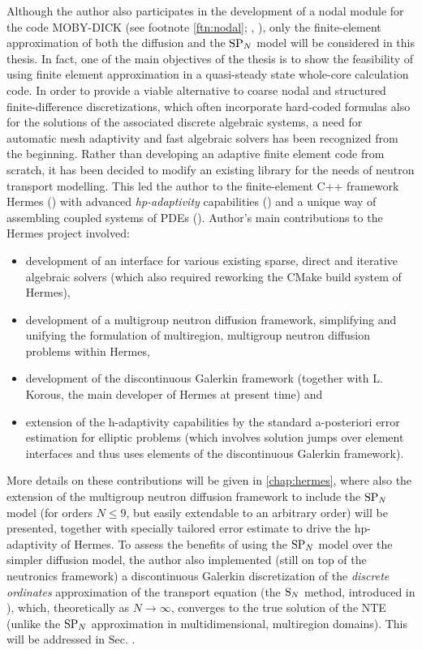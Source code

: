 Although the author also participates in the development of a nodal module for the code MOBY-DICK (see footnote
\ref{ftn:nodal}; \cite{Hanus2}, \cite[Chap. 4]{Hanus3}), only the finite-element approximation of both the diffusion and
the $\text{SP}_{N}$ model will be considered in this thesis. In fact, one of the main objectives of the thesis is to show the
feasibility of using finite element approximation in a quasi-steady state whole-core calculation code. In order to
provide a viable alternative to coarse nodal and structured finite-difference discretizations, which often incorporate
hard-coded formulas also for the solutions of the associated discrete algebraic systems, a need for automatic mesh
adaptivity and fast algebraic solvers has been recognized from the beginning. Rather than developing an adaptive finite
element code from scratch, it has been decided to modify an existing library for the needs of neutron transport
modelling. This led the author to the finite-element C++ framework Hermes (\cite{Hermes-project}) with advanced
\textit{hp-adaptivity} capabilities (\cite{Hermes-hanging-nodes}) and a unique way of assembling coupled systems of PDEs (\cite{Hermes-thermoelasticity}).
Author's main contributions to the Hermes project involved:
\begin{itemize}
    \item development of an interface for various existing sparse,
direct and iterative algebraic solvers (which also required reworking the CMake build system of Hermes),
	\item development of a multigroup neutron diffusion framework, simplifying and unifying the formulation of
	multiregion, multigroup neutron diffusion problems within Hermes,
	\item development of the discontinuous Galerkin framework (together with L. Korous, the main developer of Hermes at
	present time) and
	\item extension of the h-adaptivity capabilities by the standard a-posteriori error estimation for elliptic problems (which
involves solution jumps over element interfaces and thus uses elements of the discontinuous Galerkin framework). 
\end{itemize}
More details on these contributions will be given in \cref{chap:hermes}, where also the extension of the multigroup
neutron diffusion framework to include the $\text{SP}_{N}$ model (for orders $N \leq 9$, but easily extendable to an arbitrary
order) will be presented, together with specially tailored error estimate to drive the hp-adaptivity of Hermes. To
assess the benefits of using the $\text{SP}_{N}$ model over the simpler diffusion model, the author also implemented (still on
top of the neutronics framework) a discontinuous Galerkin discretization of the \textit{discrete ordinates}
approximation of the transport equation (the $\text{S}_{N}$ method, introduced in ), which, theoretically as $N\to\infty$, converges to the true solution of
the NTE (unlike the $\text{SP}_{N}$ approximation in multidimensional, multiregion domains). This will be addressed in Sec.
.

